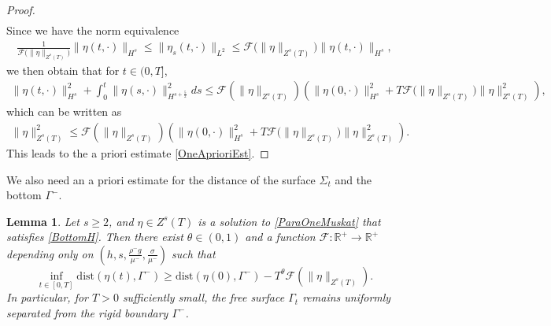 \documentclass[12pt]{amsart}
\newtheorem{lemma}[theorem]{Lemma}
\theoremstyle{definition}
\numberwithin{equation}{section}
\newcommand{\R}{\mathbb{R}}
\newcommand{\f}{\frac}
\begin{document}
\begin{proof}
\begin{align*}
\end{align*}
Since we have the norm equivalence
\begin{align*}
\f{1}{\mathcal{F}\big(\|\eta\|_{Z^s(T)} \big)}\|\eta(t,\cdot)\|_{H^s}\leq\|\eta_s(t,\cdot)\|_{L^2}\leq\mathcal{F}\big(\|\eta\|_{Z^s(T)}\big)\|\eta(t,\cdot)\|_{H^s},
\end{align*}
we then obtain that for $t\in(0,T]$,
\begin{align*}
\|\eta(t,\cdot)\|^2_{H^s}+\int_0^t\|\eta(s,\cdot)\|^2_{H^{s+\f52}}ds\leq \mathcal{F}\left(\|\eta\|_{Z^s(T)}\right)\left(\|\eta(0, \cdot)\|^2_{H^s}+T\mathcal{F}\big(\|\eta\|_{Z^s(T)}\big)\|\eta\|^2_{Z^s(T)}\right),
\end{align*}
which can be written as 
\begin{align*}
\|\eta\|_{Z^s(T)}^2\leq \mathcal{F}\left(\|\eta\|_{Z^s(T)}\right)\left(\|\eta(0, \cdot)\|_{H^s}^2+T\mathcal{F}\big(\|\eta\|_{Z^s(T)}\big)\|\eta\|^2_{Z^s(T)}\right).
\end{align*}
This leads to the a priori estimate \eqref{OneAprioriEst}.
\end{proof}


We also need an a priori estimate for the distance of the surface $\Sigma_t$ and the bottom $\Gamma^{-}$.
\begin{lemma} \label{t:DistBound}
Let $s\geq 2$, and $\eta \in Z^s(T)$ is a solution to \eqref{ParaOneMuskat} that satisfies \eqref{BottomH}.
Then there exist $\theta \in (0,1)$ and a function $\mathcal{F}: \R^+ \rightarrow \R^+$ depending only on $(h,s,\frac{\rho^- g}{\mu^-},\frac{\sigma}{\mu^-})$ such that
\begin{equation} \label{DistBound}
    \inf_{t\in[0,T]} \text{dist}(\eta(t), \Gamma^{-}) \geq \text{dist}(\eta(0), \Gamma^{-}) - T^\theta \mathcal{F}(\| \eta\|_{Z^s(T)}).
\end{equation}
In particular, for $T>0$ sufficiently small, the free surface $\Gamma_t$ remains uniformly separated from the rigid boundary $\Gamma^-$.
\end{lemma}
\end{document}
